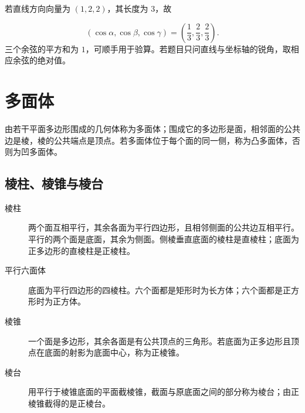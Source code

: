 \begin{examplebox}[补充：方向向量读出方向余弦]
  若直线方向向量为 $(1,2,2)$，其长度为 $3$，故
  \begin{center}
  \end{center}
  \[
    (\cos\alpha,\cos\beta,\cos\gamma)=\left(\frac13,\frac23,\frac23\right).
  \]
  三个余弦的平方和为 $1$，可顺手用于验算。若题目只问直线与坐标轴的锐角，取相应余弦的绝对值。
\end{examplebox}

\section{多面体}

由若干平面多边形围成的几何体称为多面体；围成它的多边形是面，相邻面的公共边是棱，棱的公共端点是顶点。若多面体位于每个面的同一侧，称为凸多面体，否则为凹多面体。

\subsection{棱柱、棱锥与棱台}

\begin{description}
  \item[棱柱] 两个面互相平行，其余各面为平行四边形，且相邻侧面的公共边互相平行。平行的两个面是底面，其余为侧面。侧棱垂直底面的棱柱是直棱柱；底面为正多边形的直棱柱是正棱柱。
  \item[平行六面体] 底面为平行四边形的四棱柱。六个面都是矩形时为长方体；六个面都是正方形时为正方体。
  \item[棱锥] 一个面是多边形，其余各面是有公共顶点的三角形。若底面为正多边形且顶点在底面的射影为底面中心，称为正棱锥。
  \item[棱台] 用平行于棱锥底面的平面截棱锥，截面与原底面之间的部分称为棱台；由正棱锥截得的是正棱台。
\end{description}

